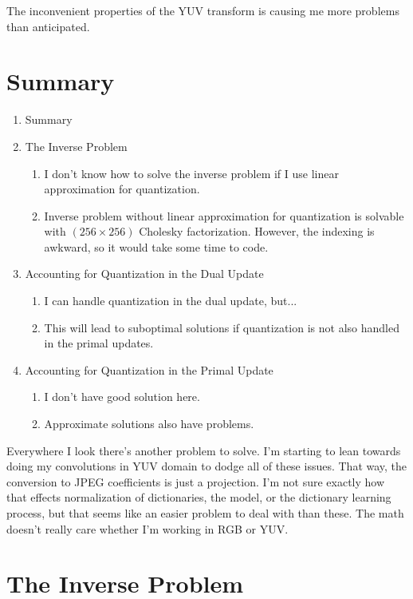 \documentclass{article}
\begin{document}
The inconvenient properties of the YUV transform is causing me more problems than anticipated.

\section{Summary}

\begin{enumerate}
\item
Summary
\item
The Inverse Problem
\begin{enumerate}
\item
I don't know how to solve the inverse problem if I use linear approximation for quantization.
\item
Inverse problem without linear approximation for quantization is solvable with $(256 \times 256)$ Cholesky factorization. However, the indexing is awkward, so it would take some time to code.
\end{enumerate}
\item
Accounting for Quantization in the Dual Update
\begin{enumerate}
\item 
I can handle quantization in the dual update, but...
\item
This will lead to suboptimal solutions if quantization is not also handled in the primal updates.
\end{enumerate}
\item
Accounting for Quantization in the Primal Update
\begin{enumerate}
\item
I don't have good solution here.
\item
Approximate solutions also have problems.
\end{enumerate}
\end{enumerate}
Everywhere I look there's another problem to solve. I'm starting to lean towards doing my convolutions in YUV domain to dodge all of these issues. That way, the conversion to JPEG coefficients is just a projection. I'm not sure exactly how that effects normalization of dictionaries, the model, or the dictionary learning process, but that seems like an easier problem to deal with than these. The math doesn't really care whether I'm working in RGB or YUV.


\section{The Inverse Problem}
\end{document}
